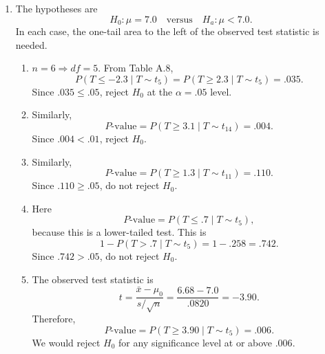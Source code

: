\documentclass[12pt]{article}
\begin{document}
\begin{enumerate}[label=\textbf{\arabic*.}, leftmargin=*]
\begin{enumerate}[label=\alph*.]
    \item When $\mu=1350$, $\bar{X}$ has a normal distribution with mean $1350$ and standard deviation $18.97$. To determine $\beta(1350)$, first find the threshold between $P$-value $\le\alpha$ and $P$-value $>\alpha$ in terms of $\bar{x}$:
    \[
    .01=P(\text{reject }H_0\mid H_0\text{ is true})=P(\bar{X}\ge\bar{x}\mid H_0\text{ is true})
    =1-\Phi\left(\frac{\bar{x}-1300}{18.97}\right).
    \]
    Hence
    \[
    \Phi\left(\frac{\bar{x}-1300}{18.97}\right)=.99
    \Rightarrow
    \frac{\bar{x}-1300}{18.97}=2.33
    \Rightarrow
    \bar{x}=1344.21.
    \]
    Thus we reject $H_0$ at the $\alpha=.01$ level if the observed value of $\bar{X}$ is at least $1344.21$. Finally,
    \[
    \beta(1350)=P(\text{do not reject }H_0\mid\mu=1350)
    =P(\bar{X}<1344.21\mid\mu=1350)
    \]
    \[
    =P\left(Z<\frac{1344.21-1350}{18.97}\right)
    \approx \Phi(-.31)=.3783.
    \]
\end{enumerate}

\setcounter{enumi}{29}
\item
The hypotheses are
\[
H_0:\mu=7.0\quad\text{versus}\quad H_a:\mu<7.0.
\]
In each case, the one-tail area to the left of the observed test statistic is needed.
\begin{enumerate}[label=\alph*.]
    \item $n=6\Rightarrow df=5$. From Table A.8,
    \[
    P(T\le-2.3\mid T\sim t_5)=P(T\ge2.3\mid T\sim t_5)=.035.
    \]
    Since $.035\le.05$, reject $H_0$ at the $\alpha=.05$ level.

    \item Similarly,
    \[
    P\text{-value}=P(T\ge3.1\mid T\sim t_{14})=.004.
    \]
    Since $.004<.01$, reject $H_0$.

    \item Similarly,
    \[
    P\text{-value}=P(T\ge1.3\mid T\sim t_{11})=.110.
    \]
    Since $.110\ge.05$, do not reject $H_0$.

    \item Here
    \[
    P\text{-value}=P(T\le .7\mid T\sim t_5),
    \]
    because this is a lower-tailed test. This is
    \[
    1-P(T>.7\mid T\sim t_5)=1-.258=.742.
    \]
    Since $.742>.05$, do not reject $H_0$.

    \item The observed test statistic is
    \[
    t=\frac{\bar{x}-\mu_0}{s/\sqrt{n}}=\frac{6.68-7.0}{.0820}=-3.90.
    \]
    Therefore,
    \[
    P\text{-value}=P(T\ge3.90\mid T\sim t_5)=.006.
    \]
    We would reject $H_0$ for any significance level at or above $.006$.
\end{enumerate}


\end{enumerate}
\end{document}
